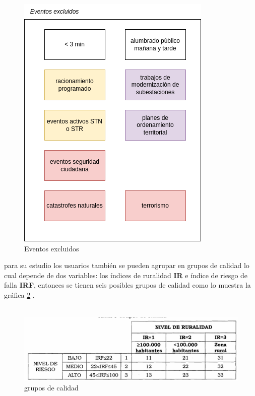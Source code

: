 \documentclass[a5paper]{book}%
\begin{document}
    \begin{figure}[H]
      \centering
      \caption{Eventos excluidos}
      \label{fig:excluidos}
      \includegraphics[width=\linewidth]{exclusiones_sdl}
    \end{figure}

    para su estudio los usuarios también se pueden agrupar en grupos
    de calidad lo cual depende de dos variables: los índices de
    ruralidad \textbf{IR} e índice de riesgo de falla \textbf{IRF},
    entonces se tienen seis posibles grupos de calidad como lo muestra
    la gráfica \ref{fig:gruposcalidad} \cite{CREG0152018}.\\\\

    \begin{figure}[H]
      \centering
      
      \caption{grupos de calidad}
      \label{fig:gruposcalidad}
      \includegraphics[width=\linewidth]{grupos_de_calidad}
    \end{figure}
\end{document}
